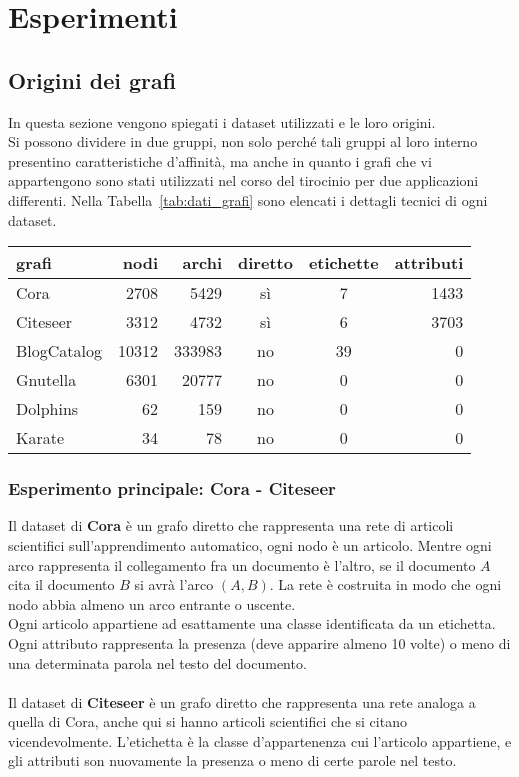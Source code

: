 
%
\chapter{Esperimenti}
\section{Origini dei grafi}
In questa sezione vengono spiegati i dataset utilizzati e le loro origini.\\
Si possono dividere in due gruppi, non solo perché tali gruppi al loro interno presentino caratteristiche d'affinità, ma anche in quanto i grafi che vi appartengono sono stati utilizzati nel corso del tirocinio per due applicazioni differenti. Nella Tabella~\ref{tab:dati_grafi} sono elencati i dettagli tecnici di ogni dataset.
%
\begin{center}
	\begin{tabular}{|l|r|r|c|c|r|}
		\hline
		grafi&nodi&archi&diretto&etichette&attributi\\
		\hline
		Cora & 2708 & 5429 & sì & 7 & 1433\\
		Citeseer & 3312 & 4732 & sì & 6 & 3703\\
		\hline
		BlogCatalog & 10312 & 333983 & no & 39 & 0\\
		Gnutella & 6301 & 20777 & no & 0 & 0\\
		Dolphins & 62 & 159 & no & 0 & 0\\
		Karate & 34 & 78 & no & 0 & 0\\
		\hline
		\end{tabular}
		\label{tab:dati_grafi}
\end{center}
%
\subsection*{Esperimento principale: Cora - Citeseer}\cite{Co-Ci_1}\cite{Co-Ci_2}
Il dataset di \textbf{Cora} è un grafo diretto che rappresenta una rete di articoli scientifici sull'apprendimento automatico, ogni nodo è un articolo. Mentre ogni arco rappresenta il collegamento fra un documento è l'altro, se il documento $A$ cita il documento $B$ si avrà l'arco $(A, B)$. La rete è costruita in modo che ogni nodo abbia almeno un arco entrante o uscente.\\
Ogni articolo appartiene ad esattamente una classe identificata da un etichetta. Ogni attributo rappresenta la presenza (deve apparire almeno 10 volte) o meno di una determinata parola nel testo del documento.\\
\\
Il dataset di \textbf{Citeseer} è un grafo diretto che rappresenta una rete analoga a quella di Cora, anche qui si hanno articoli scientifici che si citano vicendevolmente. L'etichetta è la classe d'appartenenza cui l'articolo appartiene, e gli attributi son nuovamente la presenza o meno di certe parole nel testo.\\
%
